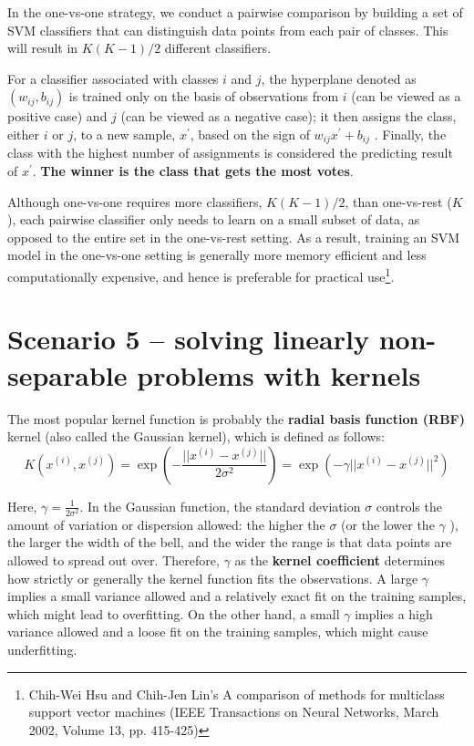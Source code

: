In the one-vs-one strategy, we conduct a pairwise comparison by building a set of
SVM classifiers that can distinguish data points from each pair of classes. This will result in $K(K-1)/2$ different classifiers.

For a classifier associated with classes $i$ and $j$, the hyperplane denoted as $(w_{ij}, b_{ij})$ is trained only on the basis of observations from $i$ (can be viewed as a positive case) and $j$ (can be viewed as a negative case); it then assigns the class, either $i$ or $j$, to a new sample, $x^{\prime}$, based on the sign of $w_{ij}x^{\prime} + b_{ij}$ . Finally, the class with the highest number of assignments is considered the predicting result of $x^{\prime}$. \textbf{The winner is the class that gets the most votes}.

Although one-vs-one requires more classifiers, $K(K - 1)/2$, than one-vs-rest ($K$), each pairwise classifier only needs to learn on a small subset of data, as opposed to the entire set in the one-vs-rest setting. As a result, training an SVM model in the one-vs-one setting is generally more memory efficient and less computationally expensive, and hence is preferable for practical use\footnote{Chih-Wei Hsu and Chih-Jen Lin's A comparison of methods for multiclass support vector machines (IEEE Transactions on Neural Networks, March 2002, Volume 13, pp. 415-425)}.

\section{Scenario 5 – solving linearly non-separable problems with kernels}
The most popular kernel function is probably the \textbf{radial basis function (RBF)} kernel (also called the Gaussian kernel), which is defined as follows:
$$K(x^{(i)}, x^{(j)})=\exp(-\frac{||x^{(i)}- x^{(j)}||}{2\sigma^2})=\exp(-\gamma||x^{(i)}- x^{(j)}||^2)$$

Here, $\gamma=\frac{1}{2\sigma^2}$. In the Gaussian function, the standard deviation $\sigma$ controls the amount of variation or dispersion allowed: the higher the $\sigma$ (or the lower the $\gamma$ ), the larger the width of the bell, and the wider the range is that data points are allowed to spread out over. Therefore, $\gamma$ as the \textbf{kernel coefficient} determines how strictly or generally the kernel function fits the observations. A large $\gamma$ implies a small variance allowed and a relatively exact fit on the training samples, which might lead to overfitting. On the other hand, a small $\gamma$ implies a high variance allowed and a loose fit on the training samples, which might cause underfitting.

